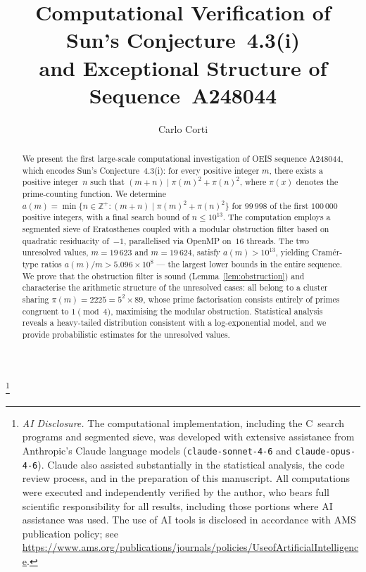 \documentclass{amsart}
\theoremstyle{definition}
\theoremstyle{remark}
\numberwithin{equation}{section}
\newcommand{\Zp}{\mathbb{Z}^{+}}
\begin{document}

\title[Computational Verification of Sun's Conjecture~4.3(i)]
{Computational Verification of Sun's Conjecture~4.3(i)\\
and Exceptional Structure of Sequence~A248044}

\author[C. Corti]{Carlo Corti}
\address{Independent researcher, 21-040 Kalin\'owka, Poland}

\thanks{%
  \textit{AI Disclosure.}
  The computational implementation, including the C~search programs
  and segmented sieve, was developed with extensive assistance
  from Anthropic's Claude language models
  (\texttt{claude-sonnet-4-6} and \texttt{claude-opus-4-6}).
  Claude also assisted substantially in the statistical analysis,
  the code review process, and in the preparation of this manuscript.
  All computations were executed and independently verified by the
  author, who bears full scientific responsibility for all results,
  including those portions where AI assistance was used.
  The use of AI tools is disclosed in accordance with AMS publication
  policy; see
  \url{https://www.ams.org/publications/journals/policies/UseofArtificialIntelligence}.%
}



\date{}

\begin{abstract}
We present the first large-scale computational investigation of
OEIS sequence A248044, which encodes Sun's Conjecture~4.3(i):
for every positive integer $m$, there exists a positive integer~$n$
such that $(m+n) \mid \pi(m)^2 + \pi(n)^2$, where $\pi(x)$ denotes
the prime-counting function.
We determine $a(m) = \min\{n \in \Zp : (m+n) \mid \pi(m)^2 + \pi(n)^2\}$
for $99\,998$ of the first $100\,000$ positive integers, with a
final search bound of $n \le 10^{13}$.
The computation employs a segmented sieve of Eratosthenes coupled
with a modular obstruction filter based on quadratic residuacity of~$-1$,
parallelised via OpenMP on~$16$ threads.
The two unresolved values, $m = 19\,623$ and $m = 19\,624$, satisfy
$a(m) > 10^{13}$, yielding Cram\'er-type ratios
$a(m)/m > 5.096 \times 10^8$ --- the largest lower bounds in the
entire sequence.
We prove that the obstruction filter is sound
(Lemma~\ref{lem:obstruction}) and characterise the arithmetic
structure of the unresolved cases: all belong to a cluster sharing
$\pi(m) = 2225 = 5^2 \times 89$, whose prime factorisation consists
entirely of primes congruent to $1 \pmod{4}$, maximising the
modular obstruction.
Statistical analysis reveals a heavy-tailed distribution
consistent with a log-exponential model, and we provide
probabilistic estimates for the unresolved values.
\end{abstract}
\end{document}
